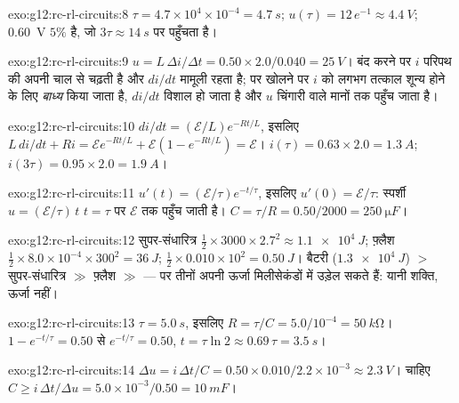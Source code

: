 \begin{solution}{exo:g12:rc-rl-circuits:8}
$\tau = 4.7\times10^{4} \times 10^{-4} = \qty{4.7}{s}$; $u(\tau) = 12\,e^{-1} \approx \qty{4.4}{V}$; \qty{0.60}{V} $5\%$ है, जो $3\tau \approx \qty{14}{s}$ पर पहुँचता है।
\end{solution}

\begin{solution}{exo:g12:rc-rl-circuits:9}
$u = L\,\Delta i/\Delta t = 0.50 \times 2.0/0.040 = \qty{25}{V}$। बंद करने पर $i$ परिपथ की अपनी चाल से चढ़ती है और $di/dt$ मामूली रहता
है; पर खोलने पर $i$ को लगभग तत्काल शून्य होने के लिए \emph{बाध्य}
किया जाता है, $di/dt$ विशाल हो जाता है और $u$ चिंगारी वाले मानों तक पहुँच
जाता है।
\end{solution}

\begin{solution}{exo:g12:rc-rl-circuits:10}
$di/dt = (\mathcal{E}/L)e^{-Rt/L}$, इसलिए $L\,di/dt + Ri =
\mathcal{E}e^{-Rt/L} + \mathcal{E}(1 - e^{-Rt/L}) = \mathcal{E}$। $i(\tau) = 0.63 \times 2.0 = \qty{1.3}{A}$; $i(3\tau) = 0.95 \times 2.0 = \qty{1.9}{A}$।
\end{solution}

\begin{solution}{exo:g12:rc-rl-circuits:11}
$u'(t) = (\mathcal{E}/\tau)e^{-t/\tau}$, इसलिए $u'(0) = \mathcal{E}/\tau$: स्पर्शी $u = (\mathcal{E}/\tau)\,t$ $t = \tau$ पर $\mathcal{E}$ तक पहुँच जाती है।
$C = \tau/R = 0.50/2000 = \qty{250}{\micro F}$।
\end{solution}

\begin{solution}{exo:g12:rc-rl-circuits:12}
सुपर-संधारित्र $\tfrac12 \times 3000 \times 2.7^2 \approx \qty{1.1e4}{J}$; फ़्लैश $\tfrac12 \times 8.0\times10^{-4} \times 300^2 = \qty{36}{J}$;  $\tfrac12 \times 0.010 \times 10^2 = \qty{0.50}{J}$। बैटरी ($\qty{1.3e4}{J}$)
$>$ सुपर-संधारित्र $\gg$ फ़्लैश $\gg$  --- पर तीनों अपनी
ऊर्जा मिलीसेकंडों में उड़ेल सकते हैं: यानी शक्ति, ऊर्जा
नहीं।
\end{solution}

\begin{solution}{exo:g12:rc-rl-circuits:13}
$\tau = \qty{5.0}{s}$, इसलिए $R = \tau/C = 5.0/10^{-4} = \qty{50}{k\ohm}$। $1 - e^{-t/\tau} = 0.50$ से $e^{-t/\tau} = 0.50$, $t = \tau\ln 2
\approx 0.69\,\tau = \qty{3.5}{s}$।
\end{solution}

\begin{solution}{exo:g12:rc-rl-circuits:14}
$\Delta u = i\,\Delta t/C = 0.50 \times 0.010/2.2\times10^{-3} \approx
\qty{2.3}{V}$। चाहिए $C \geq i\,\Delta t/\Delta u =
5.0\times10^{-3}/0.50 = \qty{10}{mF}$।
\end{solution}

